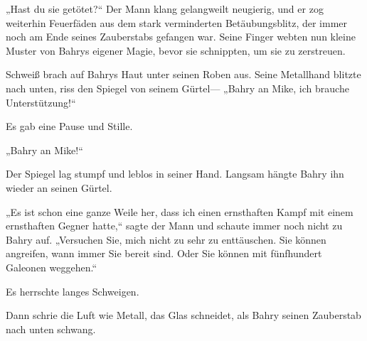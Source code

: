„Hast du sie getötet?“ Der Mann klang gelangweilt neugierig, und er zog weiterhin Feuerfäden aus dem stark verminderten Betäubungsblitz, der immer noch am Ende seines Zauberstabs gefangen war. Seine Finger webten nun kleine Muster von Bahrys eigener Magie, bevor sie schnippten, um sie zu zerstreuen.

Schweiß brach auf Bahrys Haut unter seinen Roben aus. Seine Metallhand blitzte nach unten, riss den Spiegel von seinem Gürtel— „Bahry an Mike, ich brauche Unterstützung!“

Es gab eine Pause und Stille.

„Bahry an Mike!“

Der Spiegel lag stumpf und leblos in seiner Hand. Langsam hängte Bahry ihn wieder an seinen Gürtel.

„Es ist schon eine ganze Weile her, dass ich einen ernsthaften Kampf mit einem ernsthaften Gegner hatte,“ sagte der Mann und schaute immer noch nicht zu Bahry auf. „Versuchen Sie, mich nicht zu sehr zu enttäuschen. Sie können angreifen, wann immer Sie bereit sind. Oder Sie können mit fünfhundert Galeonen weggehen.“

Es herrschte langes Schweigen.

Dann schrie die Luft wie Metall, das Glas schneidet, als Bahry seinen Zauberstab nach unten schwang.

\later

